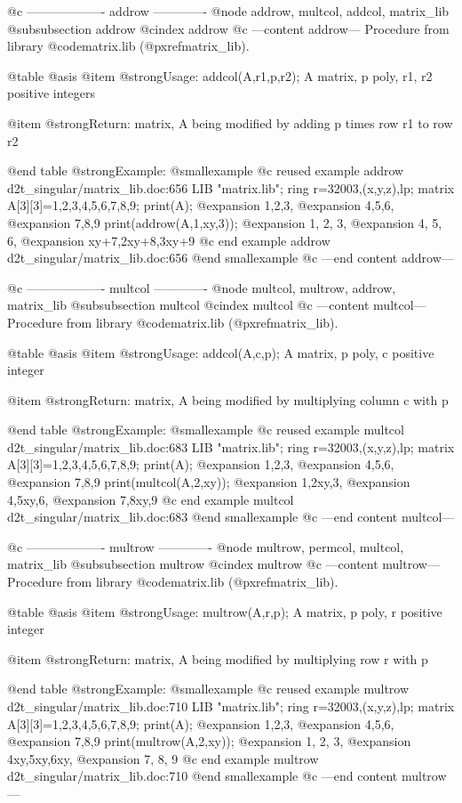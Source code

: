 @c ------------------- addrow -------------
@node addrow, multcol, addcol, matrix_lib
@subsubsection addrow
@cindex addrow
@c ---content addrow---
Procedure from library @code{matrix.lib} (@pxref{matrix_lib}).

@table @asis
@item @strong{Usage:}
addcol(A,r1,p,r2); A matrix, p poly, r1, r2 positive integers

@item @strong{Return:}
matrix, A being modified by adding p times row r1 to row r2

@end table
@strong{Example:}
@smallexample
@c reused example addrow d2t_singular/matrix_lib.doc:656 
LIB "matrix.lib";
ring r=32003,(x,y,z),lp;
matrix A[3][3]=1,2,3,4,5,6,7,8,9;
print(A);
@expansion{} 1,2,3,
@expansion{} 4,5,6,
@expansion{} 7,8,9 
print(addrow(A,1,xy,3));
@expansion{} 1,   2,    3,   
@expansion{} 4,   5,    6,   
@expansion{} xy+7,2xy+8,3xy+9
@c end example addrow d2t_singular/matrix_lib.doc:656
@end smallexample
@c ---end content addrow---

@c ------------------- multcol -------------
@node multcol, multrow, addrow, matrix_lib
@subsubsection multcol
@cindex multcol
@c ---content multcol---
Procedure from library @code{matrix.lib} (@pxref{matrix_lib}).

@table @asis
@item @strong{Usage:}
addcol(A,c,p); A matrix, p poly, c positive integer

@item @strong{Return:}
matrix, A being modified by multiplying column c with p

@end table
@strong{Example:}
@smallexample
@c reused example multcol d2t_singular/matrix_lib.doc:683 
LIB "matrix.lib";
ring r=32003,(x,y,z),lp;
matrix A[3][3]=1,2,3,4,5,6,7,8,9;
print(A);
@expansion{} 1,2,3,
@expansion{} 4,5,6,
@expansion{} 7,8,9 
print(multcol(A,2,xy));
@expansion{} 1,2xy,3,
@expansion{} 4,5xy,6,
@expansion{} 7,8xy,9 
@c end example multcol d2t_singular/matrix_lib.doc:683
@end smallexample
@c ---end content multcol---

@c ------------------- multrow -------------
@node multrow, permcol, multcol, matrix_lib
@subsubsection multrow
@cindex multrow
@c ---content multrow---
Procedure from library @code{matrix.lib} (@pxref{matrix_lib}).

@table @asis
@item @strong{Usage:}
multrow(A,r,p); A matrix, p poly, r positive integer

@item @strong{Return:}
matrix, A being modified by multiplying row r with p

@end table
@strong{Example:}
@smallexample
@c reused example multrow d2t_singular/matrix_lib.doc:710 
LIB "matrix.lib";
ring r=32003,(x,y,z),lp;
matrix A[3][3]=1,2,3,4,5,6,7,8,9;
print(A);
@expansion{} 1,2,3,
@expansion{} 4,5,6,
@expansion{} 7,8,9 
print(multrow(A,2,xy));
@expansion{} 1,  2,  3,  
@expansion{} 4xy,5xy,6xy,
@expansion{} 7,  8,  9   
@c end example multrow d2t_singular/matrix_lib.doc:710
@end smallexample
@c ---end content multrow---


